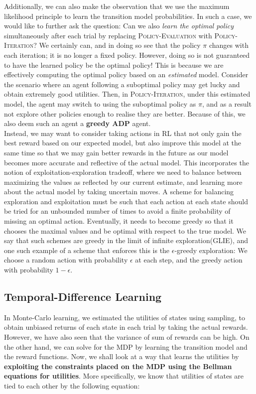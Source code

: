 \documentclass[11pt]{article}
\begin{document}
Additionally, we can also make the observation that we use the maximum likelihood principle to learn the transition model probabilities. In such a case, we would like to further ask the question: Can we also \textit{learn the optimal policy} simultaneously after each trial by replacing \textsc{Policy-Evaluation} with \textsc{Policy-Iteration}? We certainly can, and in doing so see that the policy $\pi$ changes with each iteration; it is no longer a fixed policy. However, doing so is not guaranteed to have the learned policy be the optimal policy! This is because we are effectively computing the optimal policy based on an \textit{estimated} model. Consider the scenario where an agent following a suboptimal policy may get lucky and obtain extremely good utilities. Then, in \textsc{Policy-Iteration}, under this estimated model, the agent may switch to using the suboptimal policy as $\pi$, and as a result not explore other policies enough to realise they are better. Because of this, we also deem such an agent a \textbf{greedy ADP} agent.\\

Instead, we may want to consider taking actions in RL that not only gain the best reward based on our expected model, but also improve this model at the same time so that we may gain better rewards in the future as our model becomes more accurate and reflective of the actual model. This incorporates the notion of exploitation-exploration tradeoff, where we need to balance between maximizing the values as reflected by our current estimate, and learning more about the actual model by taking uncertain moves. A scheme for balancing exploration and exploitation must be such that each action at each state should be tried for an unbounded number of times to avoid a finite probability of missing an optimal action. Eventually, it needs to become greedy so that it chooses the maximal values and be optimal with respect to the true model. We say that such schemes are greedy in the limit of infinite exploration(GLIE), and one such example of a scheme that enforces this is the $\epsilon$-greedy exploration: We choose a random action with probability $\epsilon$ at each step, and the greedy action with probability $1 - \epsilon$.

\subsection{Temporal-Difference Learning}

In Monte-Carlo learning, we estimated the utilities of states using sampling, to obtain unbiased returns of each state in each trial by taking the actual rewards. However, we have also seen that the variance of sum of rewards can be high. On the other hand, we can solve for the MDP by learning the transition model and the reward functions. Now, we shall look at a way that learns the utilities by \textbf{exploiting the constraints placed on the MDP using the Bellman equations for utilities}. More specifically, we know that utilities of states are tied to each other by the following equation:
\end{document}
